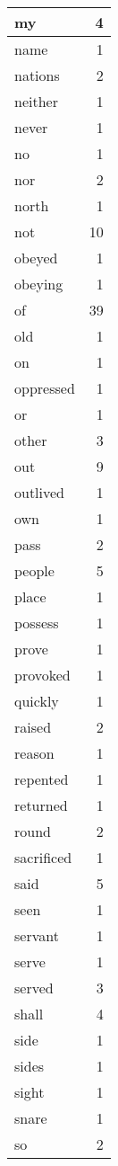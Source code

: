 \begin{center}
\begin{longtable}{l|r}
my & 4 \\ \hline
name & 1 \\ \hline
nations & 2 \\ \hline
neither & 1 \\ \hline
never & 1 \\ \hline
no & 1 \\ \hline
nor & 2 \\ \hline
north & 1 \\ \hline
not & 10 \\ \hline
obeyed & 1 \\ \hline
obeying & 1 \\ \hline
of & 39 \\ \hline
old & 1 \\ \hline
on & 1 \\ \hline
oppressed & 1 \\ \hline
or & 1 \\ \hline
other & 3 \\ \hline
out & 9 \\ \hline
outlived & 1 \\ \hline
own & 1 \\ \hline
pass & 2 \\ \hline
people & 5 \\ \hline
place & 1 \\ \hline
possess & 1 \\ \hline
prove & 1 \\ \hline
provoked & 1 \\ \hline
quickly & 1 \\ \hline
raised & 2 \\ \hline
reason & 1 \\ \hline
repented & 1 \\ \hline
returned & 1 \\ \hline
round & 2 \\ \hline
sacrificed & 1 \\ \hline
said & 5 \\ \hline
seen & 1 \\ \hline
servant & 1 \\ \hline
serve & 1 \\ \hline
served & 3 \\ \hline
shall & 4 \\ \hline
side & 1 \\ \hline
sides & 1 \\ \hline
sight & 1 \\ \hline
snare & 1 \\ \hline
so & 2 \\ \hline

\end{longtable}
\end{center}
